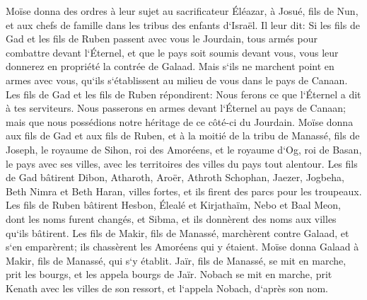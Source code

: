 \verse Moïse donna des ordres à leur sujet au sacrificateur Éléazar, à Josué, fils de Nun, et aux chefs de famille dans les tribus des enfants d`Israël. 
\verse Il leur dit: Si les fils de Gad et les fils de Ruben passent avec vous le Jourdain, tous armés pour combattre devant l`Éternel, et que le pays soit soumis devant vous, vous leur donnerez en propriété la contrée de Galaad. 
\verse Mais s`ils ne marchent point en armes avec vous, qu`ils s`établissent au milieu de vous dans le pays de Canaan. 
\verse Les fils de Gad et les fils de Ruben répondirent: Nous ferons ce que l`Éternel a dit à tes serviteurs. 
\verse Nous passerons en armes devant l`Éternel au pays de Canaan; mais que nous possédions notre héritage de ce côté-ci du Jourdain. 
\verse Moïse donna aux fils de Gad et aux fils de Ruben, et à la moitié de la tribu de Manassé, fils de Joseph, le royaume de Sihon, roi des Amoréens, et le royaume d`Og, roi de Basan, le pays avec ses villes, avec les territoires des villes du pays tout alentour. 
\verse Les fils de Gad bâtirent Dibon, Atharoth, Aroër, 
\verse Athroth Schophan, Jaezer, Jogbeha, 
\verse Beth Nimra et Beth Haran, villes fortes, et ils firent des parcs pour les troupeaux. 
\verse Les fils de Ruben bâtirent Hesbon, Élealé et Kirjathaïm, 
\verse Nebo et Baal Meon, dont les noms furent changés, et Sibma, et ils donnèrent des noms aux villes qu`ils bâtirent. 
\verse Les fils de Makir, fils de Manassé, marchèrent contre Galaad, et s`en emparèrent; ils chassèrent les Amoréens qui y étaient. 
\verse Moïse donna Galaad à Makir, fils de Manassé, qui s`y établit. 
\verse Jaïr, fils de Manassé, se mit en marche, prit les bourgs, et les appela bourgs de Jaïr. 
\verse Nobach se mit en marche, prit Kenath avec les villes de son ressort, et l`appela Nobach, d`après son nom. 


